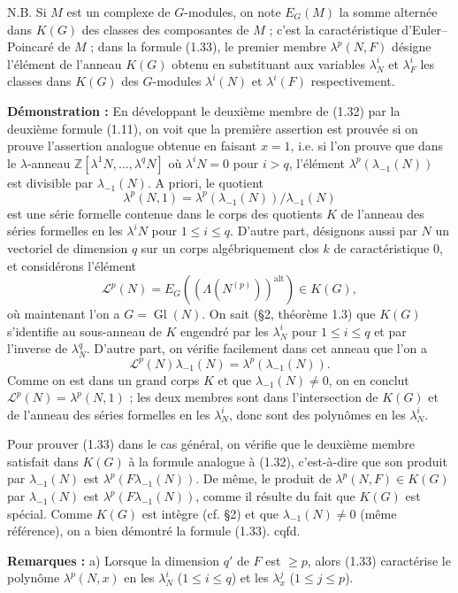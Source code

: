 \documentclass[11pt]{article}
\providecommand{\Z}{\mathbb Z}
\providecommand{\Gl}{\operatorname{Gl}}
\begin{document}
N.B. Si $M$ est un complexe de $G$-modules, on note $E_G(M)$ la somme alternée dans $K(G)$ des classes des composantes de $M$ ; c'est la caractéristique d'Euler--Poincaré de $M$ ; dans la formule (1.33), le premier membre $\lambda^p(N,F)$ désigne l'élément de l'anneau $K(G)$ obtenu en substituant aux variables $\lambda^i_N$ et $\lambda^i_F$ les classes dans $K(G)$ des $G$-modules $\lambda^i(N)$ et $\lambda^i(F)$ respectivement.

\textbf{Démonstration :} En développant le deuxième membre de (1.32) par la deuxième formule (1.11), on voit que la première assertion est prouvée si on prouve l'assertion analogue obtenue en faisant $x=1$, i.e. si l'on prouve que dans le $\lambda$-anneau $\Z[\lambda^1N,\ldots,\lambda^qN]$ où $\lambda^iN=0$ pour $i>q$, l'élément $\lambda^p(\lambda_{-1}(N))$ est divisible par $\lambda_{-1}(N)$. A priori, le quotient
\[
\lambda^p(N,1)=\lambda^p(\lambda_{-1}(N))/\lambda_{-1}(N)
\]
est une série formelle contenue dans le corps des quotients $K$ de l'anneau des séries formelles en les $\lambda^iN$ pour $1\leq i\leq q$. D'autre part, désignons aussi par $N$ un vectoriel de dimension $q$ sur un corps algébriquement clos $k$ de caractéristique $0$, et considérons l'élément
\[
\mathscr L^p(N)=E_G((\Lambda(N^{(p)}))^{\mathrm{alt}})\in K(G),
\]
où maintenant l'on a $G=\Gl(N)$. On sait (\S 2, théorème 1.3) que $K(G)$ s'identifie au sous-anneau de $K$ engendré par les $\lambda_N^i$ pour $1\leq i\leq q$ et par l'inverse de $\lambda_N^q$. D'autre part, on vérifie facilement dans cet anneau que l'on a
\[
\mathscr L^p(N)\lambda_{-1}(N)=\lambda^p(\lambda_{-1}(N)).
\]
Comme on est dans un grand corps $K$ et que $\lambda_{-1}(N)\neq0$, on en conclut $\mathscr L^p(N)=\lambda^p(N,1)$ ; les deux membres sont dans l'intersection de $K(G)$ et de l'anneau des séries formelles en les $\lambda_N^i$, donc sont des polynômes en les $\lambda_N^i$.

Pour prouver (1.33) dans le cas général, on vérifie que le deuxième membre satisfait dans $K(G)$ à la formule analogue à (1.32), c'est-à-dire que son produit par $\lambda_{-1}(N)$ est $\lambda^p(F\lambda_{-1}(N))$. De même, le produit de $\lambda^p(N,F)\in K(G)$ par $\lambda_{-1}(N)$ est $\lambda^p(F\lambda_{-1}(N))$, comme il résulte du fait que $K(G)$ est spécial. Comme $K(G)$ est intègre (cf. \S 2) et que $\lambda_{-1}(N)\neq0$ (même référence), on a bien démontré la formule (1.33). cqfd.

\textbf{Remarques :} a) Lorsque la dimension $q'$ de $F$ est $\geq p$, alors (1.33) caractérise le polynôme $\lambda^p(N,x)$ en les $\lambda_N^i$ ($1\leq i\leq q$) et les $\lambda_x^j$ ($1\leq j\leq p$).
\end{document}

